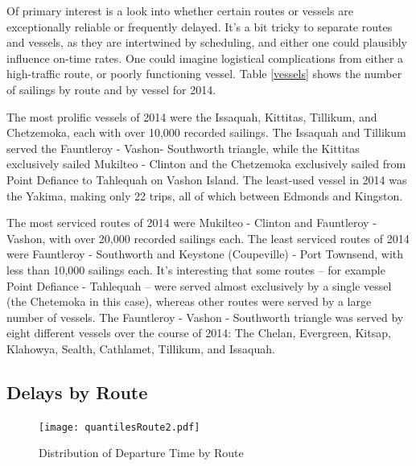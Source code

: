 \documentclass[11pt, letterpaper]{article}
\begin{document}
{\begin{landscape}
    \end{landscape}
    \clearpage%
}

Of primary interest is a look into whether certain routes or vessels are exceptionally reliable or frequently delayed. It's a bit tricky to separate routes and vessels, as they are intertwined by scheduling, and either one could plausibly influence on-time rates. One could imagine logistical complications from either a high-traffic route, or poorly functioning vessel. Table \ref{vessels} shows the number of sailings by route and by vessel for 2014. 

The most prolific vessels of 2014 were the Issaquah, Kittitas, Tillikum, and Chetzemoka, each with over 10,000 recorded sailings. The Issaquah and Tillikum served the Fauntleroy - Vashon- Southworth triangle, while the Kittitas exclusively sailed Mukilteo - Clinton and the Chetzemoka exclusively sailed from Point Defiance to Tahlequah on Vashon Island. The least-used vessel in 2014 was the Yakima, making only 22 trips, all of which between Edmonds and Kingston.

The most serviced routes of 2014 were Mukilteo - Clinton and Fauntleroy - Vashon, with over 20,000 recorded sailings each. The least serviced routes of 2014 were Fauntleroy - Southworth and Keystone (Coupeville) - Port Townsend, with less than 10,000 sailings each. It's interesting that some routes -- for example Point Defiance - Tahlequah -- were served almost exclusively by a single vessel (the Chetemoka in this case), whereas other routes were served by a large number of vessels. The Fauntleroy - Vashon - Southworth triangle was served by eight different vessels over the course of 2014: The Chelan, Evergreen, Kitsap, Klahowya, Sealth, Cathlamet, Tillikum, and Issaquah.


\subsection*{Delays by Route}

\begin{figure}[htbp]
\begin{center}
\texttt{[image: quantilesRoute2.pdf]}
\caption{Distribution of Departure Time by Route}
\label{route1}
\end{center}
\end{figure}
\end{document}
